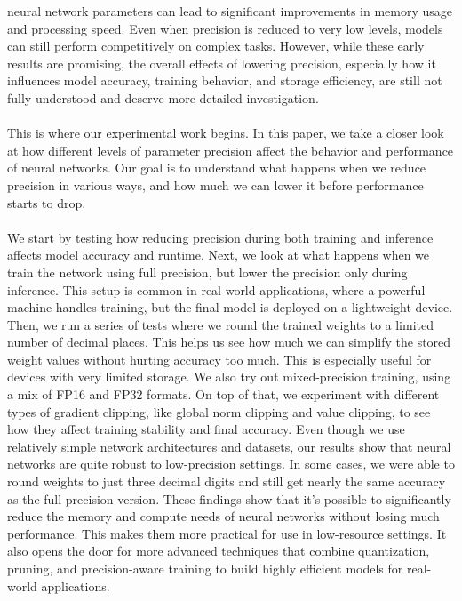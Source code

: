 \documentclass[11pt]{article}
\begin{document}
neural network parameters can lead to significant improvements in memory usage
and processing speed. Even when precision is reduced to very low levels, models
can still perform competitively on complex tasks. However, while these early
results are promising, the overall effects of lowering precision, especially
how it influences model accuracy, training behavior, and storage efficiency,
are still not fully understood and deserve more detailed investigation. \\ \\
This is where our experimental work begins. In this paper, we take a closer
look at how different levels of parameter precision affect the behavior and
performance of neural networks. Our goal is to understand what happens when we
reduce precision in various ways, and how much we can lower it before
performance starts to drop. \\ \\ We start by testing how reducing precision
during both training and inference affects model accuracy and runtime. Next, we
look at what happens when we train the network using full precision, but lower
the precision only during inference. This setup is common in real-world
applications, where a powerful machine handles training, but the final model is
deployed on a lightweight device. Then, we run a series of tests where we round
the trained weights to a limited number of decimal places. This helps us see
how much we can simplify the stored weight values without hurting accuracy too
much. This is especially useful for devices with very limited storage. We also
try out mixed-precision training, using a mix of FP16 and FP32 formats. On top
of that, we experiment with different types of gradient clipping, like global
norm clipping and value clipping, to see how they affect training stability and
final accuracy. Even though we use relatively simple network architectures and
datasets, our results show that neural networks are quite robust to
low-precision settings. In some cases, we were able to round weights to just
three decimal digits and still get nearly the same accuracy as the
full-precision version. These findings show that it’s possible to significantly
reduce the memory and compute needs of neural networks without losing much
performance. This makes them more practical for use in low-resource settings.
It also opens the door for more advanced techniques that combine quantization,
pruning, and precision-aware training to build highly efficient models for
real-world applications.
\end{document}
